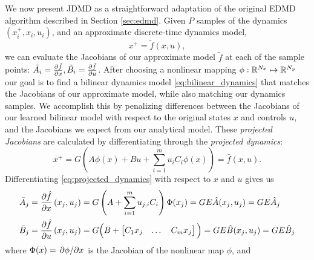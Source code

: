\documentclass{article}
\begin{document}
We now present JDMD as a straightforward adaptation of the original EDMD algorithm described
in Section \ref{sec:edmd}. Given $P$ samples of the dynamics $(x_i^+, x_i, u_i)$, and an
approximate discrete-time dynamics model,
\begin{equation}
  x^+ = \tilde{f}(x,u),
\end{equation}
we can evaluate the Jacobians of our approximate model $\tilde{f}$ at each of the sample
points: $\tilde{A}_i = \pdv{\tilde{f}}{x}, \tilde{B}_i = \pdv{\tilde{f}}{u}$. After
choosing a nonlinear mapping $\phi : \mathbb{R}^{N_x} \mapsto \mathbb{R}^{N_y}$ our goal is to find a
bilinear dynamics model \eqref{eq:bilinear_dynamics} that matches the Jacobians of our
approximate model, while also matching our dynamics samples. We accomplish this by 
penalizing differences between the Jacobians of our learned bilinear model with respect to 
the original states $x$ and controls $u$, and the Jacobians we expect from our analytical 
model. These \textit{projected Jacobians} are calculated by differentiating through the 
\textit{projected dynamics}:
\begin{equation} \label{eq:projected_dynamics}
  x^+ = G \left( A \phi(x) + B u + \sum_{i=1}^m u_i C_i \phi(x) \right)  = \bar{f}(x,u).
\end{equation}
Differentiating \eqref{eq:projected_dynamics} with respect to $x$ and $u$ gives us
\begin{subequations} \label{eq:projected_jacobians}
  \begin{align}
    \bar{A}_j &= \pdv{\hat{f}}{x}\left(x_j,u_j\right) 
    = G \left(A + \sum_{i=1}^m u_{j,i} C_i \right) \Phi(x_j)
    = G E \hat{A}(x_j,u_j) = G E \hat{A}_j \\
    \bar{B}_j &= \pdv{\hat{f}}{u}\left(x_j,u_j\right) 
    = G \Big(B + \begin{bmatrix} C_1 x_j & \dots & C_m x_j \end{bmatrix} \Big)
    = G E \hat{B}(x_j,u_j) = G E \hat{B}_j
  \end{align}
\end{subequations}
where $\Phi(x) = \pdv*{\phi}{x}$ is the Jacobian of the nonlinear map $\phi$, and
\end{document}
